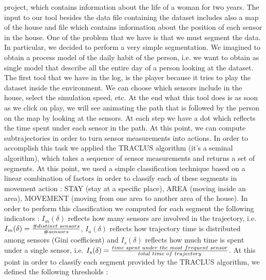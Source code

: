 \documentclass[11pt]{article}
\begin{document}
project, which contains information about the life of a woman for two years. The input to our tool besides the data file containing the dataset includes also a map of the house and file which contains information about the position of each sensor in the house. One of the problem that we have is that we must segment the data. In particular, we decided to perform a very simple segmentation. We imagined to obtain a process model of the daily habit of the person, i.e. we want to obtain as single model that describe all the entire day of a person looking at the dataset. The first tool that we have in the log, is the player because it tries to play the dataset inside the environment. We can choose which sensors include in the house, select the simulation speed, etc. At the end what this tool does is as soon as we click on play, we will see animating the path that is followed by the person on the map by looking at the sensors. At each step we have a dot which reflects the time spent under each sensor in the path. At this point, we can compute subtrajectories in order to turn sensor measurements into actions. In order to accomplish this task we applied the TRACLUS algorithm (it's a seminal algorithm), which takes a sequence of sensor measurements and returns a set of segments. At this point, we used a simple classification technique based on a linear combination of factors in order to classify each of these segments in movement action : STAY (stay at a specific place), AREA (moving inside an area), MOVEMENT (moving from one area to another area of the house). In order to perform this classification we computed for each segment the following indicators : $I_{m}(\delta)$ reflects how many sensors are involved in the trajectory, i.e. $I_{m}(\delta) = \frac{\# distinct \hspace{0.1cm} sensors}{\# sensors}$, $I_{a}(\delta)$ reflects how trajectory time is distributed among sensors (Gini coefficient) and $I_{s}(\delta)$ reflects how much time is spent under a single sensor, i.e. $I_{s}(\delta) = \frac{time \hspace{0.1cm} spent \hspace{0.1cm} under \hspace{0.1cm} the \hspace{0.1cm} most \hspace{0.1cm} frequent \hspace{0.1cm} sensor}{total \hspace{0.1cm} time \hspace{0.1cm} of \hspace{0.1cm} trajectory}$. At this point in order to classify each segment provided by the TRACLUS algorithm, we defined the following thresholds :
\end{document}
